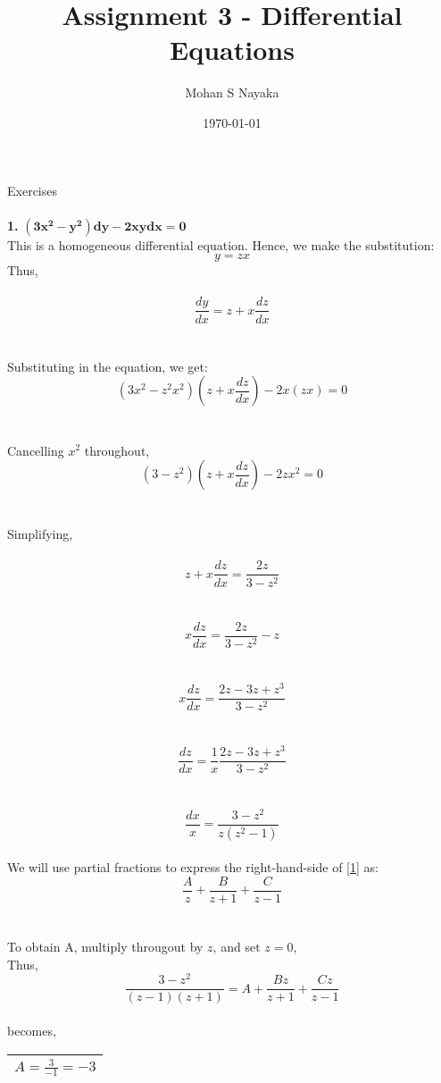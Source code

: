 \documentclass{article}
\begin{document}
\title{Assignment 3 - Differential Equations }
\date{\today}
\author{Mohan S Nayaka}
\renewcommand{\arraystretch}{1.5}
\maketitle
Exercises
\\
\\
\textbf{1. }$\mathbf{ (3x^2-y^2) dy - 2xydx = 0}$\\
This is a homogeneous differential equation. Hence, we make the substitution:
\[y=zx\]
Thus,\\
\\
\[\frac{dy}{dx}=z+x\frac{dz}{dx}\]
\\
\\
Substituting in the equation, we get:\\
\[(3x^2-z^2x^2)(z+x\frac{dz}{dx})-2x(zx)=0\]\\
\\
Cancelling $x^2$ throughout,\\
\[(3-z^2)(z+x\frac{dz}{dx})-2zx^2=0\]
\\
\\
Simplifying,
\\
\\
\[z+x\frac{dz}{dx}=\frac{2z}{3-z^2}\]
\\
\\
\[x\frac{dz}{dx}=\frac{2z}{3-z^2}-z\]
\\
\\
\[x\frac{dz}{dx}=\frac{2z-3z+z^3}{3-z^2}\]
\\
\\
\[\frac{dz}{dx}=\frac{1}{x}\frac{2z-3z+z^3}{3-z^2}\]
\\
\\
\begin{equation}
\frac{dx}{x}=\frac{3-z^2}{z(z^2-1)} \label{1}
\end{equation}
\\
We will use partial fractions to express the right-hand-side of \eqref{1} as:
\\\[\frac{A}{z}+\frac{B}{z+1}+\frac{C}{z-1}\]
\\
\\
To obtain A, multiply througout by $z$, and set $z=0$,\\
Thus,\\
\[\frac{3-z^2}{(z-1)(z+1)}=A+\frac{Bz}{z+1}+\frac{Cz}{z-1}\]\\
becomes,\\
\begin{center}
\begin{tabular}{|c|}
\hline
$A=\frac{3}{-1}=-3$\\
\hline
\end{tabular}
\\
\end{center}
\end{document}
